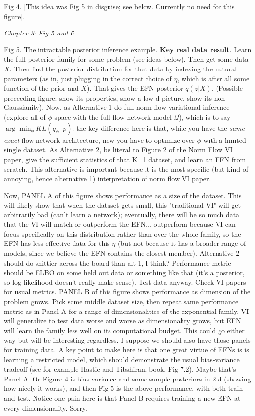 \documentclass{article}
\begin{document}
Fig 4. [This idea was Fig 5 in disguise; see below.  Currently no need for this figure].

\emph{Chapter 3: Fig 5 and 6}

Fig 5.  The intractable posterior inference example.  {\bf Key real data result}.  Learn the full posterior family for some problem (see ideas below).  Then get some data $X$.  Then find the posterior distribution for that data by indexing the natural parameters (as in, just plugging in the correct choice of $\eta$, which is after all some function of the prior and $X$).  That gives the EFN posterior  $q(z | X)$.  (Possible preceeding figure: show its properties, show a low-d picture, show its non-Gaussianity).  
Now, as Alternative 1 do full norm flow variational inference (explore all of $\phi$ space with the full flow network model $\mathcal{Q}$), which is to say $\arg\min_\phi KL(q_\phi || p)$: the key difference here is that, while you have the \emph{same exact} flow network architecture, now you have to optimize over $\phi$ with a limited single dataset.   As Alternative 2, be literal to Figure 2 of the Norm Flow VI paper, give the sufficient statistics of that K=1 dataset, and learn an EFN from scratch.  This alternative is important because it is the most specific (but kind of annoying, hence alternative 1) interpretation of norm flow VI paper.  

Now, PANEL A of this figure shows performance as a size of the dataset.  This will likely show that when the dataset gets small, this "traditional VI" will get arbitrarily bad (can't learn a network); eventually, there will be so much data that the VI will match or outperform the EFN... outperform because VI can focus specifically on this distribution rather than over the whole family, so the EFN has less effective data for this $\eta$ (but not because it has a broader range of models, since we believe the EFN contains the closest member).  Alternative 2 should do shittier across the board than alt 1, I think?   Performance metric should be ELBO on some held out data or something like that (it's a posterior, so log likelihood doesn't really make sense).  Test data anyway.   Check VI papers for usual metrics.  PANEL B of this figure shows performance as dimension of the problem grows.  Pick some middle dataset size, then repeat same performance metric as in Panel A for a range of dimensionalities of the exponential family.   VI will generalize to test data worse and worse as dimensionality grows, but EFN will learn the family less well on its computational budget.  This could go either way but will be interesting regardless.  I suppose we should also have those panels for training data.   A key point to make here is that one great virtue of EFNs is is learning a restricted model, which should demonstrate the usual bias-variance tradeoff (see for example Hastie and Tibshirani book, Fig 7.2).  Maybe that's Panel A.  Or Figure 4 is bias-variance and some sample posteriors in 2-d (showing how nicely it works), and then Fig 5 is the above performance, with both train and test.   Notice one pain here is that Panel B requires training a new EFN at every dimensionality.  Sorry.
\end{document}
